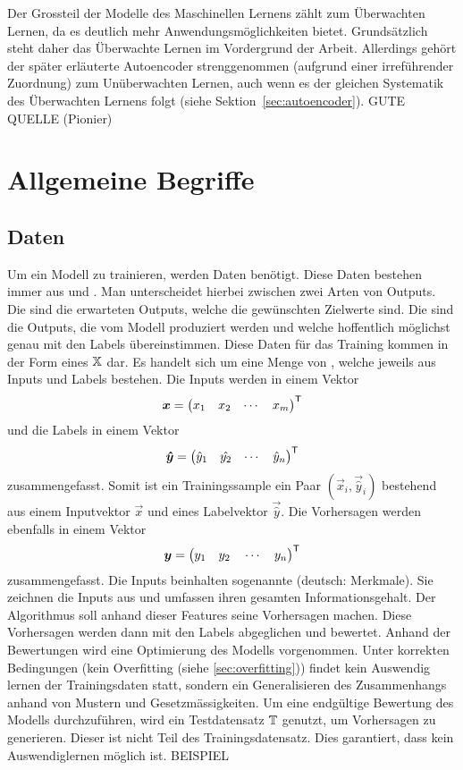 Der Grossteil der Modelle des Maschinellen Lernens zählt zum Überwachten
Lernen, da es deutlich mehr Anwendungsmöglichkeiten bietet. Grundsätzlich steht
daher das Überwachte Lernen im Vordergrund der Arbeit. Allerdings gehört der
später erläuterte Autoencoder strenggenommen (aufgrund einer irreführender Zuordnung) zum Unüberwachten Lernen, auch wenn
es der gleichen Systematik des Überwachten Lernens folgt (siehe Sektion~\ref{sec:autoencoder}).
\para{}
GUTE QUELLE (Pionier)
\cite{wiki:supervised_learning}
\cite{wiki:unsupervised_learning}

\section{Allgemeine Begriffe}

\subsection{Daten}

Um ein Modell zu trainieren, werden Daten benötigt. Diese Daten bestehen immer aus
 und . Man unterscheidet hierbei zwischen zwei Arten
von Outputs. Die  sind die erwarteten Outputs, welche die
gewünschten Zielwerte sind. Die  sind die Outputs, die vom
Modell produziert werden und welche hoffentlich möglichst genau mit den Labels
übereinstimmen.
\para{}
Diese Daten für das Training kommen in der Form eines
 $\mathbb{X}$ dar.
Es handelt sich um eine Menge von ,
welche jeweils aus Inputs und Labels bestehen.
Die Inputs werden in einem Vektor
\[ \bm{x} = \begin{pmatrix} x_1 & x_2 & \cdots & x_m \end{pmatrix}^{\mathsf{T}} \]
und die Labels in einem Vektor
\[ \bm{\hat{y}} = \begin{pmatrix} \hat{y}_1 & \hat{y_2} & \cdots & \hat{y}_n \end{pmatrix}^{\mathsf{T}} \]
zusammengefasst. Somit ist ein Trainingssample ein Paar
$(\vec{x}_i,\vec{\hat{y}}_i)$ bestehend aus einem Inputvektor $\vec{x}$ und eines Labelvektor
$\vec{\hat{y}}$.
Die Vorhersagen werden ebenfalls in einem Vektor
\[\bm{y} = \begin{pmatrix} y_1 \quad y_2 \quad \cdots \quad y_n \end{pmatrix}^{\mathsf{T}} \]
zusammengefasst.
\para{}
Die Inputs beinhalten sogenannte  (deutsch: Merkmale). Sie
zeichnen die Inputs aus und umfassen ihren gesamten Informationsgehalt.
Der Algorithmus soll
anhand dieser Features seine Vorhersagen machen.
Diese Vorhersagen werden dann mit den Labels abgeglichen und bewertet.
Anhand der Bewertungen wird eine Optimierung des Modells vorgenommen.
Unter korrekten Bedingungen (kein Overfitting (siehe \ref{sec:overfitting})) findet kein Auswendig lernen der Trainingsdaten statt,
sondern ein Generalisieren des Zusammenhangs anhand von Mustern und Gesetzmässigkeiten.
\para{}
Um eine endgültige Bewertung des Modells durchzuführen, wird ein Testdatensatz
$\mathbb{T}$ genutzt, um Vorhersagen zu generieren. Dieser ist nicht Teil des Trainingsdatensatz.
Dies garantiert, dass kein Auswendiglernen möglich ist.
\para{}
BEISPIEL


